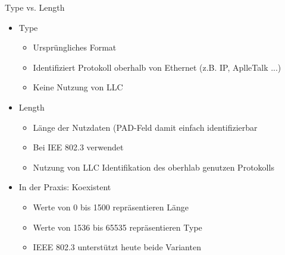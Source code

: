       Type vs. Length
      \begin{itemize}
        \item Type
          \begin{itemize}
            \item Ursprüngliches Format
            \item Identifiziert Protokoll oberhalb von Ethernet (z.B. IP, AplleTalk ...)
            \item Keine Nutzung von LLC
          \end{itemize}
        \item Length
          \begin{itemize}
            \item Länge der Nutzdaten (PAD-Feld damit einfach identifizierbar
            \item Bei IEE 802.3 verwendet
            \item Nutzung von LLC Identifikation des oberhlab genutzen Protokolls
          \end{itemize}
        \item In der Praxis: Koexistent
          \begin{itemize}
            \item Werte von 0 bis 1500 repräsentieren Länge
            \item Werte von 1536 bis 65535 repräsentieren Type
            \item IEEE 802.3 unterstützt heute beide Varianten
          \end{itemize}
      \end{itemize}
